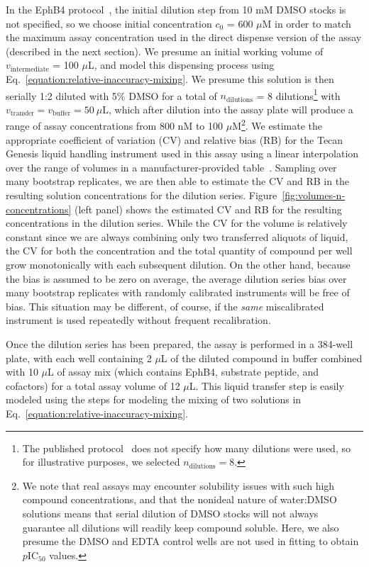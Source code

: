\documentclass[aps,pre,twocolumn,nofootinbib,superscriptaddress,linenumbers]{revtex4-1}
\begin{document}
In the EphB4 protocol~\cite{barlaam_novel_2009,barlaam_pyrimidine_2010}, the initial dilution step from 10 mM DMSO stocks is not specified, so we choose initial concentration $c_0$ = 600 $\mu$M in order to match the maximum assay concentration used in the direct dispense version of the assay (described in the next section).
We presume an initial working volume of $v_\mathrm{intermediate}$ = 100 $\mu$L, and model this dispensing process using Eq.~\ref{equation:relative-inaccuracy-mixing}.
We presume this solution is then serially 1:2 diluted with 5\% DMSO for a total of $n_\mathrm{dilutions}$ = 8 dilutions\footnote{The published protocol~\cite{barlaam_novel_2009,barlaam_pyrimidine_2010} does not specify how many dilutions were used, so for illustrative purposes, we selected $n_\mathrm{dilutions} = 8$.} with $v_\mathrm{transfer} = v_\mathrm{buffer} = 50 \: \mu\mathrm{L}$, which after dilution into the assay plate will produce a range of assay concentrations from 800 nM to 100 $\mu$M\footnote{We note that real assays may encounter solubility issues with such high compound concentrations, and that the nonideal nature of water:DMSO solutions means that serial dilution of DMSO stocks will not always guarantee all dilutions will readily keep compound soluble.  Here, we also presume the DMSO and EDTA control wells are not used in fitting to obtain $p$IC$_{50}$ values.}.
We estimate the appropriate coefficient of variation (CV) and relative bias (RB) for the Tecan Genesis liquid handling instrument used in this assay using a linear interpolation over the range of volumes in a manufacturer-provided table~\cite{_tecan_2001}.
Sampling over many bootstrap replicates, we are then able to estimate the CV and RB in the resulting solution concentrations for the dilution series.
Figure~\ref{fig:volumes-n-concentrations} (left panel) shows the estimated CV and RB for the resulting concentrations in the dilution series.
While the CV for the volume is relatively constant since we are always combining only two transferred aliquots of liquid, the CV for both the concentration and the total quantity of compound per well grow monotonically with each subsequent dilution.
On the other hand, because the bias is assumed to be zero on average, the average dilution series bias over many bootstrap replicates with randomly calibrated instruments will be free of bias.
This situation may be different, of course, if the \emph{same} miscalibrated instrument is used repeatedly without frequent recalibration.

Once the dilution series has been prepared, the assay is performed in a 384-well plate, with each well containing 2 $\mu$L of the diluted compound in buffer combined with 10 $\mu$L of assay mix (which contains EphB4, substrate peptide, and cofactors) for a total assay volume of 12 $\mu$L.
This liquid transfer step is easily modeled using the steps for modeling the mixing of two solutions in Eq.~\ref{equation:relative-inaccuracy-mixing}.
\end{document}
